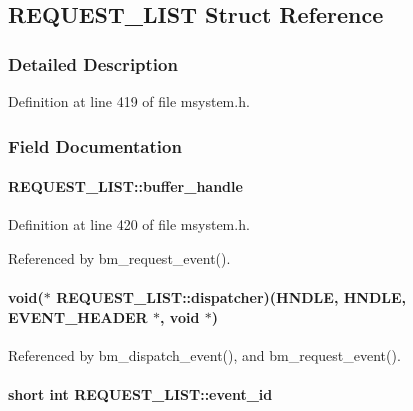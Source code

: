 \subsection{REQUEST\_\-LIST Struct Reference}
\label{structREQUEST__LIST}


\subsubsection{Detailed Description}


Definition at line 419 of file msystem.h.

\subsubsection{Field Documentation}
\paragraph[{buffer\_\-handle}]{ {\bf REQUEST\_\-LIST::buffer\_\-handle}}\hfill\label{structREQUEST__LIST_a650734f60b34db862f7a2631bbd45cc2}


Definition at line 420 of file msystem.h.

Referenced by bm\_\-request\_\-event().
\paragraph[{dispatcher}]{\setlength{\rightskip}{0pt plus 5cm}void($\ast$ {\bf REQUEST\_\-LIST::dispatcher})(HNDLE, HNDLE, {\bf EVENT\_\-HEADER} $\ast$, void $\ast$)}\hfill\label{structREQUEST__LIST_ab758c78a1c81c02eab2f378951e04100}


Referenced by bm\_\-dispatch\_\-event(), and bm\_\-request\_\-event().
\paragraph[{event\_\-id}]{\setlength{\rightskip}{0pt plus 5cm}short int {\bf REQUEST\_\-LIST::event\_\-id}}\hfill\label{structREQUEST__LIST_a9197e264672da9875f35d70c70cc6306}


